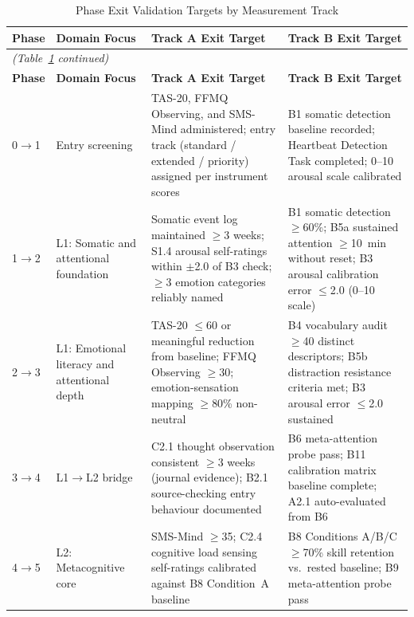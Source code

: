 \documentclass[12pt, a4paper]{article}
\begin{document}
\begin{longtable}{p{1.1cm} p{2.3cm} p{4.9cm} p{4.9cm}}
\caption{Phase Exit Validation Targets by Measurement Track}
\label{tab:phase_validation} \\
\toprule
\textbf{Phase} & \textbf{Domain Focus} & \textbf{Track A Exit Target} & \textbf{Track B Exit Target} \\
\midrule
\endfirsthead
\multicolumn{4}{l}{\small\textit{(Table~\ref{tab:phase_validation} continued)}} \\
\toprule
\textbf{Phase} & \textbf{Domain Focus} & \textbf{Track A Exit Target} & \textbf{Track B Exit Target} \\
\midrule
\endhead
\bottomrule
\endfoot

0$\to$1 &
  Entry screening &
  TAS-20, FFMQ Observing, and SMS-Mind administered; entry track (standard / extended / priority) assigned per instrument scores &
  B1 somatic detection baseline recorded; Heartbeat Detection Task completed; 0--10 arousal scale calibrated \\[4pt]

1$\to$2 &
  L1: Somatic and attentional foundation &
  Somatic event log maintained $\geq$3 weeks; S1.4 arousal self-ratings within $\pm$2.0 of B3 check; $\geq$3 emotion categories reliably named &
  B1 somatic detection $\geq$60\%; B5a sustained attention $\geq$10~min without reset; B3 arousal calibration error $\leq$2.0 (0--10 scale) \\[4pt]

2$\to$3 &
  L1: Emotional literacy and attentional depth &
  TAS-20 $\leq$60 or meaningful reduction from baseline; FFMQ Observing $\geq$30; emotion-sensation mapping $\geq$80\% non-neutral &
  B4 vocabulary audit $\geq$40 distinct descriptors; B5b distraction resistance criteria met; B3 arousal error $\leq$2.0 sustained \\[4pt]

3$\to$4 &
  L1$\to$L2 bridge &
  C2.1 thought observation consistent $\geq$3 weeks (journal evidence); B2.1 source-checking entry behaviour documented &
  B6 meta-attention probe pass; B11 calibration matrix baseline complete; A2.1 auto-evaluated from B6 \\[4pt]

4$\to$5 &
  L2: Metacognitive core &
  SMS-Mind $\geq$35; C2.4 cognitive load sensing self-ratings calibrated against B8 Condition~A baseline &
  B8 Conditions A/B/C $\geq$70\% skill retention vs.\ rested baseline; B9 meta-attention probe pass \\[4pt]


\end{longtable}
\end{document}
